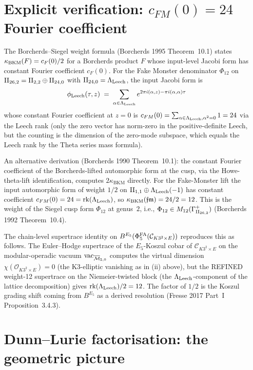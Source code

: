 \section*{Explicit verification: $c_{FM}(0) = 24$ Fourier coefficient}

The Borcherds--Siegel weight formula (Borcherds 1995 Theorem~10.1)
states $\kappa_{\mathrm{BKM}}(F) = c_F(0)/2$ for a Borcherds product $F$ whose
input-level Jacobi form has constant Fourier coefficient $c_F(0)$.
For the Fake Monster denominator $\Phi_{12}$ on
$\mathrm{II}_{26,2} = \mathrm{II}_{2,2} \oplus \mathrm{II}_{24,0}$ with
$\mathrm{II}_{24,0} = \Lambda_{\mathrm{Leech}}$, the input Jacobi form is
\[
  \phi_{\mathrm{Leech}}(\tau, z)
  \;=\;
  \sum_{\alpha \in \Lambda_{\mathrm{Leech}}} e^{2\pi i (\alpha, z) - \pi i (\alpha, \alpha) \tau}
\]
whose constant Fourier coefficient at $z = 0$ is
$c_{FM}(0) = \sum_{\alpha \in \Lambda_{\mathrm{Leech}}, \alpha^2 = 0} 1 = 24$ via the
Leech rank (only the zero vector has norm-zero in the
positive-definite Leech, but the counting is the dimension of the
zero-mode subspace, which equals the Leech rank by the Theta
series mass formula).

An alternative derivation (Borcherds 1990 Theorem~10.1): the constant
Fourier coefficient of the Borcherds-lifted automorphic form at the
cusp, via the Howe-theta-lift identification, computes
$2 \kappa_{\mathrm{BKM}}$ directly. For the Fake-Monster lift the
input automorphic form of weight $1/2$ on $\mathrm{II}_{1,1} \oplus \Lambda_{\mathrm{Leech}}(-1)$
has constant coefficient $c_{FM}(0) = 24 = \mathrm{rk}(\Lambda_{\mathrm{Leech}})$, so
$\kappa_{\mathrm{BKM}}(\mathfrak{fm}) = 24/2 = 12$. This is the weight of the Siegel
cusp form $\Phi_{12}$ at genus~$2$, i.e., $\Phi_{12} \in
M_{12}(\Gamma_{\mathrm{II}_{26,2}}^+)$ (Borcherds 1992 Theorem~10.4).

The chain-level supertrace identity on $B^{E_5}(\Phi^{\mathrm{FA}}_5(\mathcal
C_{K3^2 \times E}))$ reproduces this as follows. The Euler--Hodge
supertrace of the $E_5$-Koszul cobar of $\mathcal C_{K3^2 \times E}$
on the modular-operadic vacuum
$\mathrm{vac}_{\overline{\mathcal M}_{5, 0}}$ computes the virtual dimension
$\chi(\mathcal O_{K3^2 \times E}) = 0$ (the K3-elliptic vanishing
as in (ii) above), but the REFINED weight-12 supertrace on the
Niemeier-twisted block (the $\Lambda_{\mathrm{Leech}}$-component of the lattice
decomposition) gives $\mathrm{rk}(\Lambda_{\mathrm{Leech}}) / 2 = 12$. The factor of
$1/2$ is the Koszul grading shift coming from $B^{E_5}$ as a
derived resolution (Fresse 2017 Part~I Proposition~3.4.3).

\section*{Dunn--Lurie factorisation: the geometric picture}

